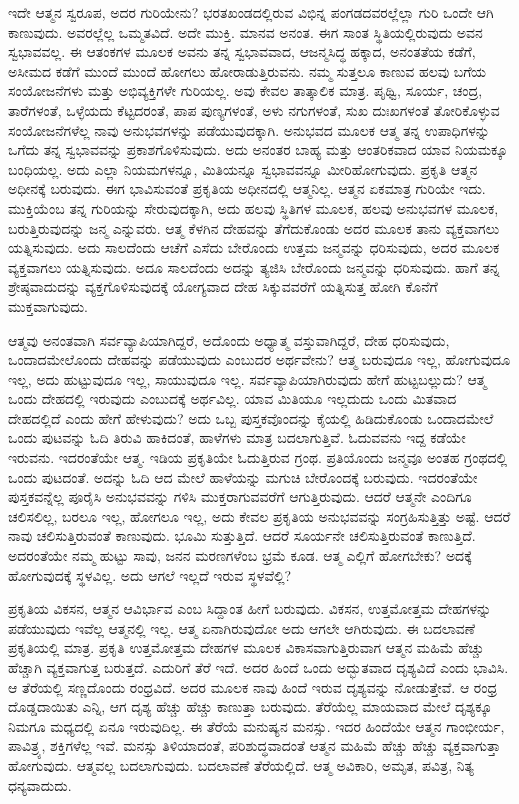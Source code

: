ಇದೇ ಆತ್ಮನ ಸ್ವರೂಪ, ಅದರ ಗುರಿಯೇನು? ಭರತಖಂಡದಲ್ಲಿರುವ ವಿಭಿನ್ನ ಪಂಗಡದವರಲ್ಲೆಲ್ಲಾ ಗುರಿ ಒಂದೇ ಆಗಿ ಕಾಣುವುದು. ಅವರಲ್ಲೆಲ್ಲ ಒಮ್ಮತವಿದೆ. ಅದೇ ಮುಕ್ತಿ. ಮಾನವ ಅನಂತ. ಈಗ ಸಾಂತ ಸ್ಥಿತಿಯಲ್ಲಿರುವುದು ಅವನ ಸ್ವಭಾವವಲ್ಲ. ಈ ಆತಂಕಗಳ ಮೂಲಕ ಅವನು ತನ್ನ ಸ್ವಭಾವವಾದ, ಆಜನ್ಮಸಿದ್ಧ ಹಕ್ಕಾದ, ಅನಂತತೆಯ ಕಡೆಗೆ, ಅಸೀಮದ ಕಡೆಗೆ ಮುಂದೆ ಮುಂದೆ ಹೋಗಲು ಹೋರಾಡುತ್ತಿರುವನು. ನಮ್ಮ ಸುತ್ತಲೂ ಕಾಣುವ ಹಲವು ಬಗೆಯ ಸಂಯೋಜನೆಗಳು ಮತ್ತು ಅಭಿವ್ಯಕ್ತಿಗಳೇ ಗುರಿಯಲ್ಲ. ಅವು ಕೇವಲ ತಾತ್ಕಾಲಿಕ ಮಾತ್ರ. ಪೃಥ್ವಿ, ಸೂರ್ಯ, ಚಂದ್ರ, ತಾರೆಗಳಂತೆ, ಒಳ್ಳೆಯದು ಕೆಟ್ಟದರಂತೆ, ಪಾಪ ಪುಣ್ಯಗಳಂತೆ, ಅಳು ನಗುಗಳಂತೆ, ಸುಖ ದುಃಖಗಳಂತೆ ತೋರಿಕೊಳ್ಳುವ ಸಂಯೋಜನೆಗಳೆಲ್ಲ ನಾವು ಅನುಭವಗಳನ್ನು ಪಡೆಯುವುದಕ್ಕಾಗಿ. ಅನುಭವದ ಮೂಲಕ ಆತ್ಮ ತನ್ನ ಉಪಾಧಿಗಳನ್ನು ಒಗೆದು ತನ್ನ ಸ್ವಭಾವವನ್ನು ಪ್ರಕಾಶಗೊಳಿಸುವುದು. ಅದು ಅನಂತರ ಬಾಹ್ಯ ಮತ್ತು ಆಂತರಿಕವಾದ ಯಾವ ನಿಯಮಕ್ಕೂ ಬಂಧಿಯಲ್ಲ. ಅದು ಎಲ್ಲಾ ನಿಯಮಗಳನ್ನೂ, ಮಿತಿಯನ್ನೂ ಸ್ವಭಾವವನ್ನೂ ಮೀರಿಹೋಗುವುದು. ಪ್ರಕೃತಿ ಆತ್ಮನ ಅಧೀನಕ್ಕೆ ಬರುವುದು. ಈಗ ಭಾವಿಸುವಂತೆ ಪ್ರಕೃತಿಯ ಅಧೀನದಲ್ಲಿ ಆತ್ಮನಿಲ್ಲ. ಆತ್ಮನ ಏಕಮಾತ್ರ ಗುರಿಯೇ ಇದು. ಮುಕ್ತಿಯೆಂಬ ತನ್ನ ಗುರಿಯನ್ನು ಸೇರುವುದಕ್ಕಾಗಿ, ಅದು ಹಲವು ಸ್ಥಿತಿಗಳ ಮೂಲಕ, ಹಲವು ಅನುಭವಗಳ ಮೂಲಕ, ಬರುತ್ತಿರುವುದನ್ನು ಜನ್ಮ ಎನ್ನುವರು. ಆತ್ಮ ಕೆಳಗಿನ ದೇಹವನ್ನು ತೆಗೆದುಕೊಂಡು ಅದರ ಮೂಲಕ ತಾನು ವ್ಯಕ್ತವಾಗಲು ಯತ್ನಿಸುವುದು. ಅದು ಸಾಲದೆಂದು ಆಚೆಗೆ ಎಸೆದು ಬೇರೊಂದು ಉತ್ತಮ ಜನ್ಮವನ್ನು ಧರಿಸುವುದು, ಅದರ ಮೂಲಕ ವ್ಯಕ್ತವಾಗಲು ಯತ್ನಿಸುವುದು. ಅದೂ ಸಾಲದೆಂದು ಅದನ್ನು ತ್ಯಜಿಸಿ ಬೇರೊಂದು ಜನ್ಮವನ್ನು ಧರಿಸುವುದು. ಹಾಗೆ ತನ್ನ ಶ್ರೇಷ್ಠವಾದುದನ್ನು ವ್ಯಕ್ತಗೊಳಿಸುವುದಕ್ಕೆ ಯೋಗ್ಯವಾದ ದೇಹ ಸಿಕ್ಕುವವರೆಗೆ ಯತ್ನಿಸುತ್ತ ಹೋಗಿ ಕೊನೆಗೆ ಮುಕ್ತವಾಗುವುದು.

ಆತ್ಮವು ಅನಂತವಾಗಿ ಸರ್ವವ್ಯಾಪಿಯಾಗಿದ್ದರೆ, ಅದೊಂದು ಅಧ್ಯಾತ್ಮ ವಸ್ತುವಾಗಿದ್ದರೆ, ದೇಹ ಧರಿಸುವುದು, ಒಂದಾದಮೇಲೊಂದು ದೇಹವನ್ನು ಪಡೆಯುವುದು ಎಂಬುದರ ಅರ್ಥವೇನು? ಆತ್ಮ ಬರುವುದೂ ಇಲ್ಲ, ಹೋಗುವುದೂ ಇಲ್ಲ, ಅದು ಹುಟ್ಟುವುದೂ ಇಲ್ಲ, ಸಾಯುವುದೂ ಇಲ್ಲ. ಸರ್ವವ್ಯಾಪಿಯಾಗಿರುವುದು ಹೇಗೆ ಹುಟ್ಟಬಲ್ಲುದು? ಆತ್ಮ ಒಂದು ದೇಹದಲ್ಲಿ ಇರುವುದು ಎಂಬುದಕ್ಕೆ ಅರ್ಥವಿಲ್ಲ. ಯಾವ ಮಿತಿಯೂ ಇಲ್ಲದುದು ಒಂದು ಮಿತವಾದ ದೇಹದಲ್ಲಿದೆ ಎಂದು ಹೇಗೆ ಹೇಳುವುದು? ಅದು ಒಬ್ಬ ಪುಸ್ತಕವೊಂದನ್ನು ಕೈಯಲ್ಲಿ ಹಿಡಿದುಕೊಂಡು ಒಂದಾದಮೇಲೆ ಒಂದು ಪುಟವನ್ನು ಓದಿ ತಿರುವಿ ಹಾಕಿದಂತೆ, ಹಾಳೆಗಳು ಮಾತ್ರ ಬದಲಾಗುತ್ತಿವೆ. ಓದುವವನು ಇದ್ದ ಕಡೆಯೇ ಇರುವನು. ಇದರಂತೆಯೇ ಆತ್ಮ. ಇಡಿಯ ಪ್ರಕೃತಿಯೇ ಓದುತ್ತಿರುವ ಗ್ರಂಥ. ಪ್ರತಿಯೊಂದು ಜನ್ಮವೂ ಅಂತಹ ಗ್ರಂಥದಲ್ಲಿ ಒಂದು ಪುಟದಂತೆ. ಅದನ್ನು ಓದಿ ಆದ ಮೇಲೆ ಹಾಳೆಯನ್ನು ಮಗುಚಿ ಬೇರೊಂದಕ್ಕೆ ಬರುವುದು. ಇದರಂತೆಯೇ ಪುಸ್ತಕವನ್ನೆಲ್ಲ ಪೂರೈಸಿ ಅನುಭವವನ್ನು ಗಳಿಸಿ ಮುಕ್ತರಾಗುವವರೆಗೆ ಆಗುತ್ತಿರುವುದು. ಆದರೆ ಆತ್ಮನೇ ಎಂದಿಗೂ ಚಲಿಸಲಿಲ್ಲ, ಬರಲೂ ಇಲ್ಲ, ಹೋಗಲೂ ಇಲ್ಲ, ಅದು ಕೇವಲ ಪ್ರಕೃತಿಯ ಅನುಭವವನ್ನು ಸಂಗ್ರಹಿಸುತ್ತಿತ್ತು ಅಷ್ಟೆ. ಆದರೆ ನಾವು ಚಲಿಸುತ್ತಿರುವಂತೆ ಕಾಣುವುದು. ಭೂಮಿ ಸುತ್ತುತ್ತಿದೆ. ಆದರೆ ಸೂರ್ಯನೇ ಚಲಿಸುತ್ತಿರುವಂತೆ ಕಾಣುತ್ತಿದೆ. ಅದರಂತೆಯೇ ನಮ್ಮ ಹುಟ್ಟು ಸಾವು, ಜನನ ಮರಣಗಳೆಂಬ ಭ್ರಮೆ ಕೂಡ. ಆತ್ಮ ಎಲ್ಲಿಗೆ ಹೋಗಬೇಕು? ಅದಕ್ಕೆ ಹೋಗುವುದಕ್ಕೆ ಸ್ಥಳವಿಲ್ಲ. ಅದು ಆಗಲೆ ಇಲ್ಲದೆ ಇರುವ ಸ್ಥಳವೆಲ್ಲಿ?

ಪ್ರಕೃತಿಯ ವಿಕಸನ, ಆತ್ಮನ ಆವಿರ್ಭಾವ ಎಂಬ ಸಿದ್ದಾಂತ ಹೀಗೆ ಬರುವುದು. ವಿಕಸನ, ಉತ್ತಮೋತ್ತಮ ದೇಹಗಳನ್ನು ಪಡೆಯುವುದು ಇವೆಲ್ಲ ಆತ್ಮನಲ್ಲಿ ಇಲ್ಲ. ಆತ್ಮ ಏನಾಗಿರುವುದೋ ಅದು ಆಗಲೇ ಆಗಿರುವುದು. ಈ ಬದಲಾವಣೆ ಪ್ರಕೃತಿಯಲ್ಲಿ ಮಾತ್ರ. ಪ್ರಕೃತಿ ಉತ್ತಮೋತ್ತಮ ದೇಹಗಳ ಮೂಲಕ ವಿಕಾಸವಾಗುತ್ತಿರುವಾಗ ಆತ್ಮನ ಮಹಿಮೆ ಹೆಚ್ಚು ಹೆಚ್ಚಾಗಿ ವ್ಯಕ್ತವಾಗುತ್ತ ಬರುತ್ತದೆ. ಎದುರಿಗೆ ತೆರೆ ಇದೆ. ಅದರ ಹಿಂದೆ ಒಂದು ಅದ್ಭುತವಾದ ದೃಶ್ಯವಿದೆ ಎಂದು ಭಾವಿಸಿ. ಆ ತೆರೆಯಲ್ಲಿ ಸಣ್ಣದೊಂದು ರಂಧ್ರವಿದೆ. ಅದರ ಮೂಲಕ ನಾವು ಹಿಂದೆ ಇರುವ ದೃಶ್ಯವನ್ನು ನೋಡುತ್ತೇವೆ. ಆ ರಂಧ್ರ ದೊಡ್ಡದಾಯಿತು ಎನ್ನಿ, ಆಗ ದೃಶ್ಯ ಹೆಚ್ಚು ಹೆಚ್ಚು ಕಾಣುತ್ತಾ ಬರುವುದು. ತೆರೆಯೆಲ್ಲ ಮಾಯವಾದ ಮೇಲೆ ದೃಶ್ಯಕ್ಕೂ ನಿಮಗೂ ಮಧ್ಯದಲ್ಲಿ ಏನೂ ಇರುವುದಿಲ್ಲ. ಈ ತೆರೆಯೆ ಮನುಷ್ಯನ ಮನಸ್ಸು. ಇದರ ಹಿಂದೆಯೇ ಆತ್ಮನ ಗಾಂಭೀರ್ಯ, ಪಾವಿತ್ರ್ಯ, ಶಕ್ತಿಗಳೆಲ್ಲ ಇವೆ. ಮನಸ್ಸು ತಿಳಿಯಾದಂತೆ, ಪರಿಶುದ್ಧವಾದಂತೆ ಆತ್ಮನ ಮಹಿಮೆ ಹೆಚ್ಚು ಹೆಚ್ಚು ವ್ಯಕ್ತವಾಗುತ್ತಾ ಹೋಗುವುದು. ಆತ್ಮವಲ್ಲ ಬದಲಾಗುವುದು. ಬದಲಾವಣೆ ತೆರೆಯಲ್ಲಿದೆ. ಆತ್ಮ ಅವಿಕಾರಿ, ಅಮೃತ, ಪವಿತ್ರ, ನಿತ್ಯ ಧನ್ಯವಾದುದು.


